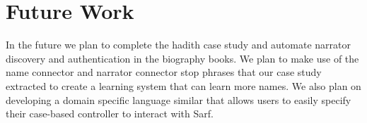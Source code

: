 \documentclass[11pt,letterpaper]{article}
\begin{document}
\section{Future Work}
\label{sec:future}

In the future we plan to complete the hadith case study 
and automate narrator discovery and authentication in the 
biography books. 
We plan to make use of the name connector and narrator
connector stop phrases that our case study extracted to create a 
learning system that can learn more names. 
We also plan on developing a domain specific language similar 
that allows users to easily specify their case-based controller
to interact with Sarf.








{\small }
\end{document}
